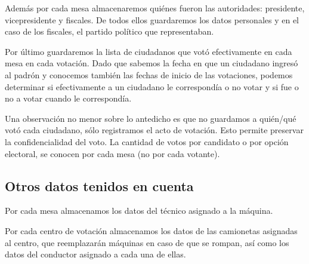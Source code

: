 Además por cada mesa almacenaremos quiénes fueron las autoridades: presidente, vicepresidente y fiscales.
De todos ellos guardaremos los datos personales y en el caso de los fiscales, el partido político que representaban.

Por último guardaremos la lista de ciudadanos que votó efectivamente en cada mesa en cada votación. Dado que sabemos la 
fecha en que un ciudadano ingresó al padrón y conocemos también las fechas de inicio de las votaciones, podemos determinar si
efectivamente a un ciudadano le correspondía o no votar y si fue o no a votar cuando le correspondía.

Una observación no menor sobre lo antedicho es que no guardamos a quién/qué votó cada ciudadano, sólo registramos el acto de votación.
Esto permite preservar la confidencialidad del voto. La cantidad de votos por candidato o por opción electoral, se conocen por cada
mesa (no por cada votante).

\subsection{Otros datos tenidos en cuenta}
Por cada mesa almacenamos los datos del técnico asignado a la máquina.

Por cada centro de votación almacenamos los datos de las camionetas asignadas al centro,
que reemplazarán máquinas en caso de que se rompan, así como los datos del conductor asignado a cada una de ellas.
